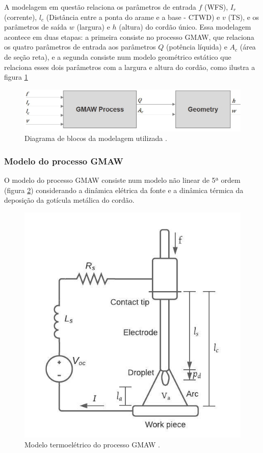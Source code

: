 A modelagem em questão relaciona os parâmetros de entrada $f$ (WFS), $I_r$ (corrente), $l_c$ (Distância entre a ponta do arame e a base - CTWD) e $v$ (TS), e os parâmetros de saída $w$ (largura) e $h$ (altura) do cordão único. Essa modelagem acontece em duas etapas: a primeira consiste no processo GMAW, que relaciona os quatro parâmetros de entrada aos parâmetros $Q$ (potência líquida) e $A_c$ (área de seção reta), e a segunda consiste num modelo geométrico estático que relaciona esses dois parâmetros com a largura e altura do cordão, como ilustra a figura \ref{fig:sim_blocks}

\begin{figure}[hbt!]
    \centering
    \includegraphics[width=0.8\linewidth]{Imagens/chap02/sim_blocks.png}
    \caption{Diagrama de blocos da modelagem utilizada \cite{bendia2021multivariable}.}
    \label{fig:sim_blocks}
\end{figure}

\subsubsection{Modelo do processo GMAW}
O modelo do processo GMAW consiste num modelo não linear de 5ª ordem (figura \ref{fig:gmaw_model}) considerando a dinâmica elétrica da fonte e a dinâmica térmica da deposição da gotícula metálica do cordão. 

\begin{figure}[hbt!]
    \centering
    \includegraphics[width=0.5\linewidth]{Imagens/chap02/gmaw_model.png}
    \caption{Modelo termoelétrico do processo GMAW \cite{bendia2021multivariable}.}
    \label{fig:gmaw_model}
\end{figure}

